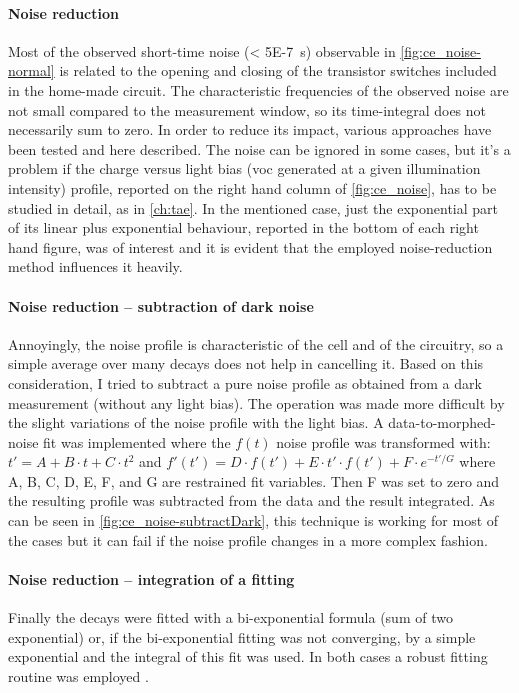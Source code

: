 	\paragraph{Noise reduction}\label{r_ce_noise} Most of the observed short-time noise (\SI{< 5E-7}{\s}) observable in \cref{fig:ce_noise-normal} is related to the opening and closing of the transistor switches included in the home-made circuit. The characteristic frequencies of the observed noise are not small compared to the measurement window, so its time-integral does not necessarily sum to zero.
	In order to reduce its impact, various approaches have been tested and here described.
	The noise can be ignored in some cases, but it's a problem if the charge versus light bias (\gls{voc} generated at a given illumination intensity) profile, reported on the right hand column of \cref{fig:ce_noise}, has to be studied in detail, as in \cref{ch:tae}.
	In the mentioned case, just the exponential part of its linear plus exponential behaviour, reported in the bottom of each right hand figure, was of interest and it is evident that the employed noise-reduction method influences it heavily.
	
	\paragraph{Noise reduction -- subtraction of dark noise} Annoyingly, the noise profile is characteristic of the cell and of the circuitry, so a simple average over many decays does not help in cancelling it. Based on this consideration, I tried to subtract a pure noise profile as obtained from a dark measurement (without any light bias). The operation was made more difficult by the slight variations of the noise profile with the light bias. A data-to-morphed-noise fit was implemented where the $f(t)$ noise profile was transformed with:$t'= A + B \cdot t + C \cdot t^2$ and $f'(t') = D \cdot f(t') + E \cdot t' \cdot f(t') + F \cdot e^{-t'/G}$ where A, B, C, D, E, F, and G are restrained fit variables. Then F was set to zero and the resulting profile was subtracted from the data and the result integrated. As can be seen in \cref{fig:ce_noise-subtractDark}, this technique is working for most of the cases but it can fail if the noise profile changes in a more complex fashion.
	
	
	\paragraph{Noise reduction -- integration of a fitting} Finally the decays were fitted with a bi-exponential formula (sum of two exponential) or, if the bi-exponential fitting was not converging, by a simple exponential and the integral of this fit was used. In both cases a robust fitting routine was employed \cite{Maechler2018}.
	
